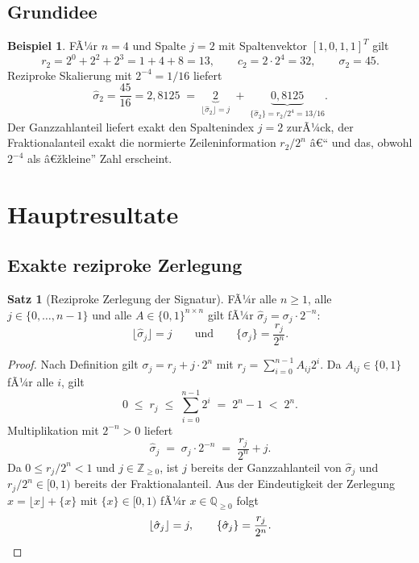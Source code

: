 ﻿\documentclass[a4paper,12pt]{article}
\theoremstyle{definition}
\newtheorem{beispiel}{Beispiel}
\newtheorem{satz}{Satz}
\begin{document}
\subsection{Grundidee}

\begin{beispiel}
	FÃ¼r $n=4$ und Spalte $j=2$ mit Spaltenvektor $[1,0,1,1]^T$ gilt
	\[
		r_2 = 2^0 + 2^2 + 2^3 = 1 + 4 + 8 = 13, \qquad
		c_2 = 2 \cdot 2^4 = 32, \qquad
		\sigma_2 = 45.
	\]
	Reziproke Skalierung mit $2^{-4} = 1/16$ liefert
	\[
		\hat\sigma_2 = \frac{45}{16} = 2{,}8125
		\;=\; \underbrace{2}_{\lfloor \hat\sigma_2 \rfloor = j}
		\;+\; \underbrace{0{,}8125}_{\{\hat\sigma_2\} = r_2/2^4 = 13/16}.
	\]
	Der Ganzzahlanteil liefert exakt den Spaltenindex $j=2$ zurÃ¼ck, der
	Fraktionalanteil exakt die normierte Zeileninformation $r_2/2^n$ â€“
	und das, obwohl $2^{-4}$ als â€žkleine'' Zahl erscheint.
\end{beispiel}

\section{Hauptresultate}

\subsection{Exakte reziproke Zerlegung}

\begin{satz}[Reziproke Zerlegung der Signatur]
\label{satz:zerlegung}
	FÃ¼r alle $n \geq 1$, alle $j \in \{0,\ldots,n-1\}$ und alle
	$A \in \{0,1\}^{n\times n}$ gilt fÃ¼r $\hat\sigma_j = \sigma_j \cdot 2^{-n}$:
	\[
		\lfloor \hat\sigma_j \rfloor = j
		\qquad\text{und}\qquad
		\{\hat\sigma_j\} = \frac{r_j}{2^n}.
	\]
\end{satz}

\begin{proof}
	Nach Definition gilt $\sigma_j = r_j + j\cdot 2^n$ mit
	$r_j = \sum_{i=0}^{n-1}A_{ij}2^i$. Da $A_{ij}\in\{0,1\}$ fÃ¼r alle $i$, gilt
	\[
		0 \;\leq\; r_j \;\leq\; \sum_{i=0}^{n-1} 2^i \;=\; 2^n - 1 \;<\; 2^n.
	\]
	Multiplikation mit $2^{-n} > 0$ liefert
	\[
		\hat\sigma_j \;=\; \sigma_j \cdot 2^{-n}
		\;=\; \frac{r_j}{2^n} + j.
	\]
	Da $0 \leq r_j/2^n < 1$ und $j \in \mathbb{Z}_{\geq 0}$, ist $j$ bereits der
	Ganzzahlanteil von $\hat\sigma_j$ und $r_j/2^n \in [0,1)$ bereits der
	Fraktionalanteil. Aus der Eindeutigkeit der Zerlegung
	$x = \lfloor x \rfloor + \{x\}$ mit $\{x\}\in[0,1)$ fÃ¼r $x \in \mathbb{Q}_{\geq0}$
	folgt
	\[
		\lfloor \hat\sigma_j \rfloor = j, \qquad \{\hat\sigma_j\} = \frac{r_j}{2^n}. \qedhere
	\]
\end{proof}
\end{document}
